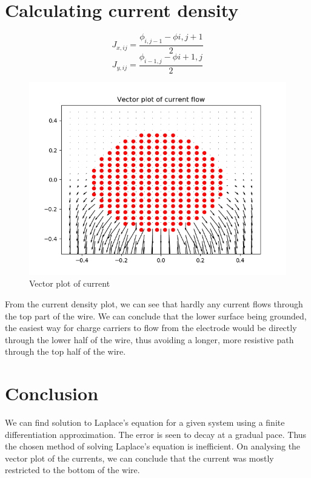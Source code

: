 \documentclass[11pt, a4paper]{article}
\begin{document}
\section{Calculating current density}
\begin{equation}
J_{x, ij} = \frac{\phi_{i, j-1} - \phi{i, j+1}} {2}
\end{equation}
\begin{equation}
J_{y, ij} = \frac{\phi_{i-1, j} - \phi{i+1, j}} {2}
\end{equation}
\begin{figure}[!tbh]
   	\centering
   	\includegraphics[scale=0.5]{fig8.png}  %
   	\caption{Vector plot of current}
   	\label{fig:sample}
   \end{figure}
From the current density plot, we can see that hardly any current flows through the top part of  the wire. We can conclude that the lower surface being grounded, the easiest way for charge carriers to flow from the electrode would be directly through the lower half of the wire, thus
avoiding a longer, more resistive path through the top half of the wire.

\section{Conclusion}
We can find solution to Laplace's equation for a given system using a finite differentiation approximation. The error is seen to decay at a gradual pace. Thus the chosen method of solving Laplace’s equation is inefficient. 
On analysing the vector plot of the currents, we can conclude that the current was mostly restricted to the bottom of the wire.
\end{document}

